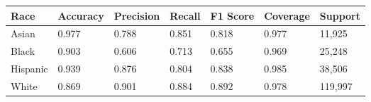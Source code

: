 \begin{tabular}{lllllll}
\toprule
Race & Accuracy & Precision & Recall & F1 Score & Coverage & Support \\
\midrule
Asian & 0.977 & 0.788 & 0.851 & 0.818 & 0.977 & 11,925 \\
Black & 0.903 & 0.606 & 0.713 & 0.655 & 0.969 & 25,248 \\
Hispanic & 0.939 & 0.876 & 0.804 & 0.838 & 0.985 & 38,506 \\
White & 0.869 & 0.901 & 0.884 & 0.892 & 0.978 & 119,997 \\
\bottomrule
\end{tabular}
